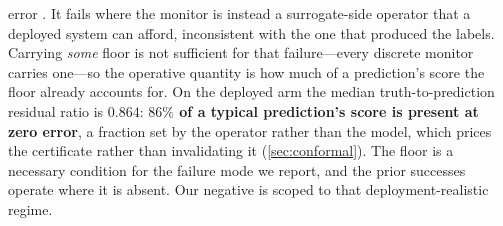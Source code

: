 error \citep{lei2026newtonkrylov}. It fails where the monitor is instead a
surrogate-side operator that a deployed system can afford, inconsistent with the one
that produced the labels. Carrying \emph{some} floor is not sufficient for that
failure---every discrete monitor carries one---so the operative quantity is how much
of a prediction's score the floor already accounts for. On the deployed arm the median
truth-to-prediction residual ratio is $0.864$: \textbf{$86\%$ of a typical
prediction's score is present at zero error}, a fraction set by the operator rather
than the model, which prices the certificate rather than invalidating it
(\autoref{sec:conformal}). The floor is a necessary condition for the failure mode
we report, and the prior successes operate where it is absent. Our negative is scoped
to that deployment-realistic regime.



